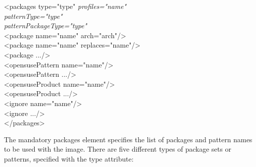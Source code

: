 \begin{Command}{12cm}
<packages type="type" \textit{profiles="name"}\\
\hspace*{2.5cm}\textit{patternType="type"}\\
\hspace*{2.5cm}\textit{patternPackageType="type"}\\
\hspace*{1cm}<package name="name" arch="arch"/>\\
\hspace*{1cm}<package name="name" replaces="name"/>\\
\hspace*{1cm}<package .../>\\
\hspace*{1cm}<opensusePattern name="name"/>\\
\hspace*{1cm}<opensusePattern .../>\\
\hspace*{1cm}<opensuseProduct name="name"/>\\
\hspace*{1cm}<opensuseProduct .../>\\
\hspace*{1cm}<ignore name="name"/>\\
\hspace*{1cm}<ignore .../>\\
</packages>
\end{Command}

The mandatory packages element specifies the list of packages and
pattern names to be used with the image. There are five different
types of package sets or patterns, specified with the type attribute:

